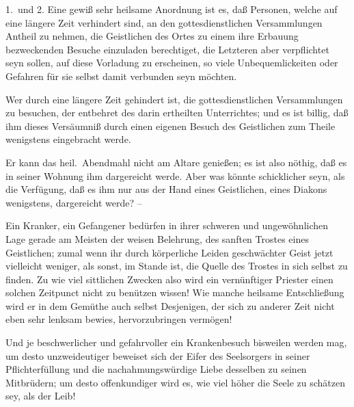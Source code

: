 \begin{aufza}
\item[1.\ und 2.] Eine gewiß sehr heilsame Anordnung ist es, daß Personen, welche auf eine längere Zeit verhindert sind, an den gottesdienstlichen Versammlungen Antheil zu nehmen, die Geistlichen des Ortes zu einem ihre Erbauung bezweckenden Besuche einzuladen berechtiget, die Letzteren aber verpflichtet seyn sollen, auf diese Vorladung zu erscheinen, so viele Unbequemlickeiten oder Gefahren für sie selbst damit verbunden seyn möchten.
\begin{aufzb}
\item Wer durch eine längere Zeit gehindert ist, die gottesdienstlichen Versammlungen zu besuchen, der entbehret des darin ertheilten Unterrichtes; und es ist billig, daß ihm dieses Versäumniß durch einen eigenen Besuch des Geistlichen zum Theile wenigstens eingebracht werde.
\item Er kann das heil.\ Abendmahl nicht am Altare genießen; es ist also nöthig, daß es in seiner Wohnung ihm dargereicht werde. Aber was könnte schicklicher seyn, als die Verfügung, daß es ihm nur aus der Hand eines Geistlichen, eines Diakons wenigstens, dargereicht werde? --
\item Ein Kranker, ein Gefangener bedürfen in ihrer schweren und ungewöhnlichen Lage gerade am Meisten der weisen Belehrung, des sanften Trostes eines Geistlichen; zumal wenn ihr durch körperliche Leiden geschwächter Geist jetzt vielleicht weniger, als sonst, im Stande ist, die Quelle des Trostes in sich selbst zu finden. Zu wie viel sittlichen Zwecken also wird ein vernünftiger Priester einen solchen Zeitpunct nicht zu benützen wissen! Wie manche heilsame Entschließung wird er in dem Gemüthe auch selbst Desjenigen, der sich zu anderer Zeit nicht eben sehr lenksam bewies, hervorzubringen vermögen!
\item Und je beschwerlicher und gefahrvoller ein Krankenbesuch bisweilen werden mag, um desto unzweideutiger beweiset sich der Eifer des Seelsorgers in seiner Pflichterfüllung und die nachahmungswürdige Liebe desselben zu seinen Mitbrüdern; um desto offenkundiger wird es, wie viel höher die Seele zu schätzen sey, als der Leib!
\end{aufzb}

\end{aufza}
